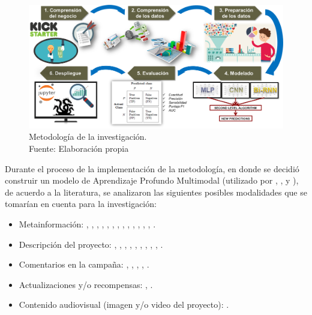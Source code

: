 \begin{figure}[htbp]
	\begin{center}
		\includegraphics[width=1\textwidth]{3/figures/metodologia.png}
		\caption[Metodología de la investigación]{Metodología de la investigación.\\
			Fuente: Elaboración propia}
		\label{3:fig2}
	\end{center}
\end{figure}

Durante el proceso de la implementación de la metodología, en donde se decidió construir un modelo de Aprendizaje Profundo Multimodal (utilizado por \cite{pr_kamath2018suplearn}, \cite{pr_jin2019dayssuccess}, y \cite{pr_cheng2019deeplearning}), de acuerdo a la literatura, se analizaron las siguientes posibles modalidades que se tomarían en cuenta para la investigación:

\begin{itemize}
	\item Metainformación: \cite{pr_chen2013kickpredict}, \cite{pr_mitra2014phrases}, \cite{pr_zhou2015projectdesc}, \cite{pr_chen2015predcrowd}, \cite{pr_beckwith2016predcrowd}, \cite{pr_li2016predcrowd}, \cite{pr_yuan2016textanalytics}, \cite{pr_sawhney2016usingLT}, \cite{pr_kaur2017socmedcrowd}, \cite{pr_kamath2018suplearn}, \cite{pr_yu2018deeplearning}, \cite{pr_jin2019dayssuccess}, \cite{pr_cheng2019deeplearning}, \cite{pr_fernandezblanco2020crowdfunding_empirical}.
	\item Descripción del proyecto: \cite{pr_mitra2014phrases}, \cite{pr_zhou2015projectdesc}, \cite{pr_yuan2016textanalytics}, \cite{pr_sawhney2016usingLT}, \cite{pr_kamath2018suplearn}, \cite{pr_lee2018contentDL}, \cite{pr_jin2019dayssuccess}, \cite{pr_cheng2019deeplearning}, \cite{pr_chen2019keywords_crowdfunding}, \cite{pr_chaichi2019nlp_3dprinting}.
	\item Comentarios en la campaña: \cite{pr_chen2015predcrowd}, \cite{pr_li2016predcrowd}, \cite{pr_lee2018contentDL}, \cite{pr_jin2019dayssuccess}, \cite{pr_shafqat2019topicpredictions}.
	\item Actualizaciones y/o recompensas: \cite{pr_zhou2015projectdesc}, \cite{pr_lee2018contentDL}.
	\item Contenido audiovisual (imagen y/o video del proyecto): \cite{pr_cheng2019deeplearning}.
\end{itemize}

